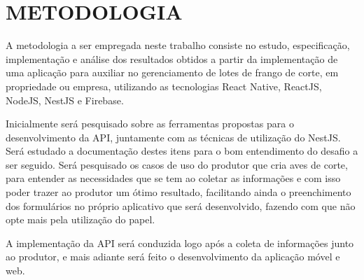 
\chapter{METODOLOGIA}
\label{chap:metodologia}

A metodologia a ser empregada neste trabalho consiste no estudo, especificação, implementação e análise dos resultados obtidos a partir da implementação de uma aplicação para auxiliar no gerenciamento de lotes  de frango de corte, em propriedade ou empresa, utilizando as tecnologias React Native, ReactJS, NodeJS, NestJS e Firebase.


Inicialmente será pesquisado sobre as ferramentas propostas para o desenvolvimento da API, juntamente com as técnicas de utilização do NestJS. Será estudado a documentação destes itens para o bom entendimento do desafio a ser seguido. Será pesquisado os casos de uso do produtor que cria aves de corte, para entender as necessidades que se tem ao coletar as informações e com isso poder trazer ao produtor um ótimo resultado, facilitando ainda o preenchimento dos formulários no próprio aplicativo que será desenvolvido, fazendo com que não opte mais pela utilização do papel. 

A implementação da API será conduzida logo após a coleta de informações junto ao produtor, e mais adiante será feito o desenvolvimento da aplicação móvel e web.
